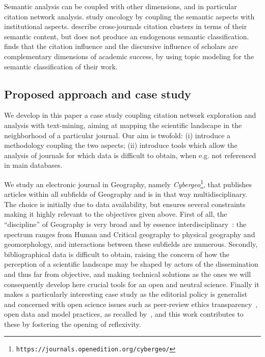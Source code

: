 Semantic analysis can be coupled with other dimensions, and in particular citation network analysis. \cite{bras2017oncology} study oncology by coupling the semantic aspects with institutional aspects. \cite{zhang2010journal} describe cross-journals citation clusters in terms of their semantic content, but does not produce an endogenous semantic classification. \cite{gerow2018measuring} finds that the citation influence and the discursive influence of scholars are complementary dimensions of academic success, by using topic modeling for the semantic classification of their work.



\subsection*{Proposed approach and case study}

We develop in this paper a case study coupling citation network exploration and analysis with text-mining, aiming at mapping the scientific landscape in the neighborhood of a particular journal. Our aim is twofold: (i) introduce a methodology coupling the two aspects; (ii) introduce tools which allow the analysis of journals for which data is difficult to obtain, when e.g. not referenced in main databases.

We study an electronic journal in Geography, namely \textit{Cybergeo}\footnote{\texttt{https://journals.openedition.org/cybergeo/}}, that publishes articles within all subfields of Geography and is in that way multidisciplinary. The choice is initially due to data availability, but ensures several constraints making it highly relevant to the objectives given above. First of all, the ``discipline'' of Geography is very broad and by essence interdisciplinary~\citep{bracken2016interdisciplinarity}: the spectrum ranges from Human and Critical geography to physical geography and geomorphology, and interactions between these subfields are numerous. Secondly, bibliographical data is difficult to obtain, raising the concern of how the perception of a scientific landscape may be shaped by actors of the dissemination and thus far from objective, and making technical solutions as the ones we will consequently develop here crucial tools for an open and neutral science. Finally it makes a particularly interesting case study as the editorial policy is generalist and concerned with open science issues such as peer-review ethics transparency~\citep{10.1371/journal.pone.0147913}, open data and model practices, as recalled by~\cite{pumain2015adapting}, and this work contributes to these by fostering the opening of reflexivity.


